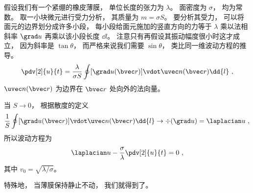 
\begin{issues}
\issueDraft
\end{issues}


假设我们有一个紧绷的橡皮薄膜， 单位长度的张力为 $\lambda$。 面密度为 $\sigma$， 均为常数。 取一小块微元进行受力分析， 其质量为 $m = \sigma S$。 要分析其受力， 可以将面元的边界划分成许多小段， 每小段给面元施加的竖直方向的力等于 $\lambda$ 乘以法相斜率 $\grad u$ 再乘以该小段长度 $\dd{l}$。 注意只有再假设其振动幅度很小时这才成立， 因为斜率是 $\tan\theta$， 而严格来说我们需要 $\sin\theta$， 类比同一维波动方程的推导。
\begin{equation}
\pdv[2]{u}{t} = \frac{\lambda}{\sigma S}\oint [\grad u(\bvec r)] \vdot \uvec n(\bvec r) \dd{l}~,
\end{equation}
$\uvec n(\bvec r)$ 为边界在 $\bvec r$ 处向外的法向量。

当 $S \to 0$， 根据散度的定义
\begin{equation}
\frac{1}{S} \oint [\grad u(\bvec r)] \vdot \uvec n(\bvec r) \dd{l} \to \div (\grad u) = \laplacian u~,
\end{equation}
所以波动方程为
\begin{equation}
\laplacian u - \frac{\sigma}{\lambda}\pdv[2]{u}{t} = 0~,
\end{equation}
其中 $v_0 = \sqrt{\lambda/\sigma}$。

特殊地， 当薄膜保持静止不动， 我们就得到了。
